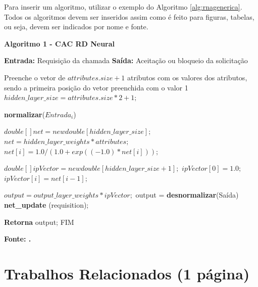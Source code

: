 Para inserir um algoritmo, utilizar o exemplo do Algoritmo  \ref{alg:rnagenerica}.
Todos os algoritmos devem ser inseridos assim como é feito para figuras, tabelas, ou seja, devem ser indicados por nome e fonte.


\begin{center}	
    \textbf{Algoritmo 1 -  CAC RD Neural}
	\vspace{-0.3cm}
\begin{minipage}[ht]{13cm}
\begin{algorithm}[H]
  \footnotesize
  \caption{CAC-RD Neural}
  \label{alg:rnagenerica}
  \begin{algorithmic}[1]
      \STATE \textbf{Entrada:} Requisição da chamada
    \STATE \textbf{Saída:} Aceitação ou bloqueio da solicitação
    
    \STATE Preenche o vetor de $attributes.size+1$ atributos com os valores dos atributos, sendo a primeira posição do vetor preenchida com o valor 1
		\STATE $hidden\_layer\_size =  attributes.size*2+1;$

    	\STATE \textbf{normalizar}($Entrada_i$)
    \ENDFOR

		\STATE $double [] net = new double [hidden\_layer\_size];$
    \STATE $net = hidden\_layer\_weights * attributes;$
			\STATE $net [i] = 1.0 / (1.0 + exp((-1.0)*net[i]));$
		\ENDFOR

		\STATE $double [] ipVector = new double [hidden\_layer\_size+1];$
    \STATE $ipVector [0] = 1.0;$
			\STATE $ipVector [i] = net [i-1];$
		\ENDFOR
		
		\STATE $output = output\_layer\_weights *  ipVector;$
    \STATE output = \textbf{desnormalizar}(Saída)
    \STATE \textbf{net\_update} (requisition);
    
    \STATE \textbf{Retorna} output; FIM
  \end{algorithmic}
\end{algorithm}

\small \centering \textbf{\footnotesize Fonte: .}
\end{minipage}
\end{center}
   
\section{\esp Trabalhos Relacionados (1 página)}

